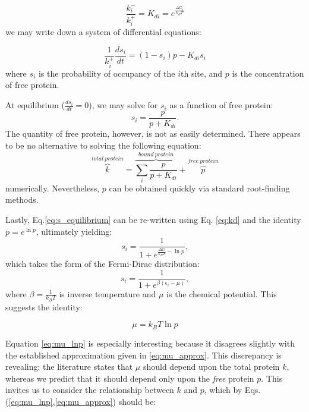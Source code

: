 \documentclass{article}
\begin{document}
\begin{equation}\label{eq:kd}
  \frac{k^-_i}{k^+_i} = K_{di} = e^{\frac{\Delta G_i}{k_BT}}
\end{equation}
we may write down a system of differential equations:

\begin{equation}
  \label{eq:s_diff}
  \frac{1}{k_i^+}\frac{ds_i}{dt} = (1-s_i)p - K_{di}s_i
\end{equation}
where $s_i$ is the probability of occupancy of the $i$th site, and $p$
is the concentration of free protein.

At equilibrium ($\frac{ds_i}{dt} = 0$), we may solve for $s_i$ as a
function of free protein:
\begin{equation}
  \label{eq:s_equilibrium}
  s_i = \frac{p}{p + K_{di}}.
\end{equation}
The quantity of free protein, however, is not as easily determined.
There appears to be no alternative to solving the following equation:
\begin{equation}
  \label{eq:p_numeric}
  \overset{total\ protein}{\overbrace{k}} = \overset{bound\ protein}{\overbrace{\displaystyle\sum_i\frac{p}{p + K_{di}}}} + \overset{free\ protein}{\overbrace{p}}
\end{equation}
numerically.  Nevertheless, $p$ can be obtained quickly via standard
root-finding methods.

Lastly, Eq.\ref{eq:s_equilibrium} can be re-written using
Eq. \ref{eq:kd} and the identity $p = e^{\ln p}$, ultimately yielding:
\begin{equation}
  s_i = \frac{1}{1 + e^{\frac{\Delta G}{k_BT}  - \ln p}},
\end{equation}
which takes the form of the Fermi-Dirac distribution:
\begin{equation}
  \label{eq:s_fd}
  s_i = \frac{1}{1 + e^{\beta(\epsilon_i - \mu)}},
\end{equation}
where $\beta = \frac{1}{k_BT}$ is inverse temperature and $\mu$ is the
chemical potential.  This suggests the identity:

\begin{equation}
  \label{eq:mu_lnp}
  \mu = k_BT \ln p
\end{equation}

Equation \ref{eq:mu_lnp} is especially interesting because it
disagrees slightly with the established approximation given in
\ref{eq:mu_approx}.  This discrepancy is revealing: the literature
states that $\mu$ should depend upon the total protein $k$, whereas we
predict that it should depend only upon the \textit{free} protein $p$.
This invites us to consider the relationship between $k$ and $p$,
which by Eqs. (\ref{eq:mu_lnp},\ref{eq:mu_approx}) should be:
\end{document}
